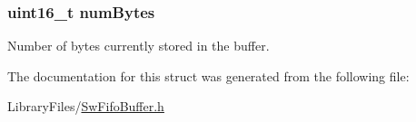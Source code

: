 \subsubsection[{num\+Bytes}]{\setlength{\rightskip}{0pt plus 5cm}uint16\+\_\+t num\+Bytes}\label{structswFifoBuffer__t_a625d064298a0c5f99429e3be56b16f18}
Number of bytes currently stored in the buffer. 

The documentation for this struct was generated from the following file\+:\begin{DoxyCompactItemize}
\item 
Library\+Files/\hyperlink{SwFifoBuffer_8h}{Sw\+Fifo\+Buffer.\+h}\end{DoxyCompactItemize}

